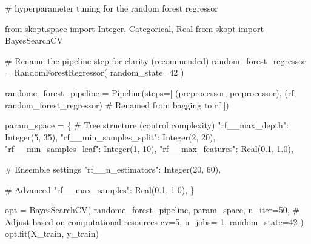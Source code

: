 \documentclass[
  letterpaper,
  DIV=11,
  numbers=noendperiod]{scrreprt}
\newenvironment{Shaded}{\begin{snugshade}}{\end{snugshade}}
\newcommand{\CommentTok}[1]{\textcolor[rgb]{0.37,0.37,0.37}{#1}}
\newcommand{\DecValTok}[1]{\textcolor[rgb]{0.68,0.00,0.00}{#1}}
\newcommand{\FloatTok}[1]{\textcolor[rgb]{0.68,0.00,0.00}{#1}}
\newcommand{\ImportTok}[1]{\textcolor[rgb]{0.00,0.46,0.62}{#1}}
\newcommand{\NormalTok}[1]{\textcolor[rgb]{0.00,0.23,0.31}{#1}}
\newcommand{\OperatorTok}[1]{\textcolor[rgb]{0.37,0.37,0.37}{#1}}
\newcommand{\StringTok}[1]{\textcolor[rgb]{0.13,0.47,0.30}{#1}}
\begin{document}
\begin{Shaded}
\begin{Highlighting}[]
\CommentTok{\# hyperparameter tuning for the random forest regressor}

\ImportTok{from}\NormalTok{ skopt.space }\ImportTok{import}\NormalTok{ Integer, Categorical, Real}
\ImportTok{from}\NormalTok{ skopt }\ImportTok{import}\NormalTok{ BayesSearchCV}

\CommentTok{\# Rename the pipeline step for clarity (recommended)}
\NormalTok{random\_forest\_regressor }\OperatorTok{=}\NormalTok{ RandomForestRegressor(}
\NormalTok{    random\_state}\OperatorTok{=}\DecValTok{42}
\NormalTok{)}

\NormalTok{randome\_forest\_pipeline }\OperatorTok{=}\NormalTok{ Pipeline(steps}\OperatorTok{=}\NormalTok{[}
\NormalTok{    (}\StringTok{\textquotesingle{}preprocessor\textquotesingle{}}\NormalTok{, preprocessor),}
\NormalTok{    (}\StringTok{\textquotesingle{}rf\textquotesingle{}}\NormalTok{, random\_forest\_regressor)  }\CommentTok{\# Renamed from \textquotesingle{}bagging\textquotesingle{} to \textquotesingle{}rf\textquotesingle{}}
\NormalTok{])}

\NormalTok{param\_space }\OperatorTok{=}\NormalTok{ \{}
    \CommentTok{\# Tree structure (control complexity)}
    \StringTok{"rf\_\_max\_depth"}\NormalTok{: Integer(}\DecValTok{5}\NormalTok{, }\DecValTok{35}\NormalTok{),  }
    \StringTok{"rf\_\_min\_samples\_split"}\NormalTok{: Integer(}\DecValTok{2}\NormalTok{, }\DecValTok{20}\NormalTok{),}
    \StringTok{"rf\_\_min\_samples\_leaf"}\NormalTok{: Integer(}\DecValTok{1}\NormalTok{, }\DecValTok{10}\NormalTok{),}
    \StringTok{"rf\_\_max\_features"}\NormalTok{: Real(}\FloatTok{0.1}\NormalTok{, }\FloatTok{1.0}\NormalTok{),}
    
    \CommentTok{\# Ensemble settings}
    \StringTok{"rf\_\_n\_estimators"}\NormalTok{: Integer(}\DecValTok{20}\NormalTok{, }\DecValTok{60}\NormalTok{),}
    
    \CommentTok{\# Advanced}
    \StringTok{"rf\_\_max\_samples"}\NormalTok{: Real(}\FloatTok{0.1}\NormalTok{, }\FloatTok{1.0}\NormalTok{),}
\NormalTok{\}}

\NormalTok{opt }\OperatorTok{=}\NormalTok{ BayesSearchCV(}
\NormalTok{    randome\_forest\_pipeline,}
\NormalTok{    param\_space,}
\NormalTok{    n\_iter}\OperatorTok{=}\DecValTok{50}\NormalTok{,  }\CommentTok{\# Adjust based on computational resources}
\NormalTok{    cv}\OperatorTok{=}\DecValTok{5}\NormalTok{,}
\NormalTok{    n\_jobs}\OperatorTok{={-}}\DecValTok{1}\NormalTok{,}
\NormalTok{    random\_state}\OperatorTok{=}\DecValTok{42}
\NormalTok{)}
\NormalTok{opt.fit(X\_train, y\_train)  }


\end{Highlighting}
\end{Shaded}
\end{document}
